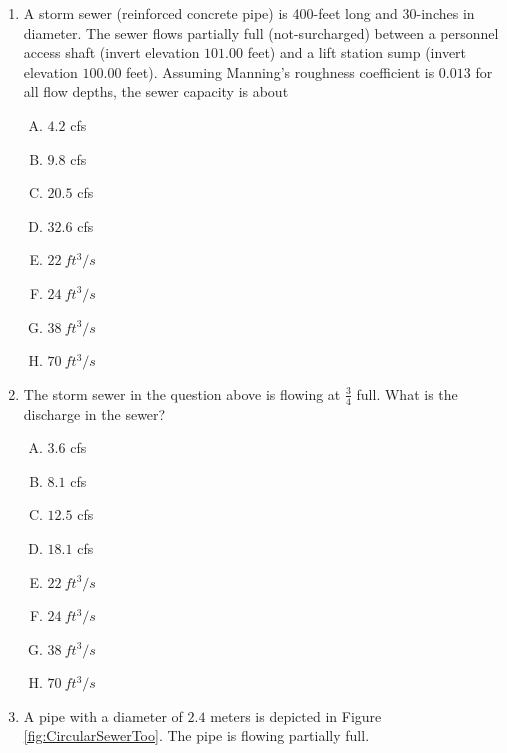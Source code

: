 \documentclass[11pt]{article}
\begin{document}
\begin{enumerate}
%
\item  A storm sewer (reinforced concrete pipe) is 400-feet long and 30-inches in diameter.  The sewer flows partially full (not-surcharged) between a personnel access shaft (invert elevation $101.00$ feet) and a lift station sump (invert elevation $100.00$ feet).  Assuming Manning's roughness coefficient is $0.013$ for all flow depths, the sewer capacity is about
\begin{enumerate} [(A)]
\item  $4.2$ cfs
\item  $9.8$ cfs
\item  $20.5$ cfs
\item  $32.6$ cfs
\item $22~ft^3/s$
\item $24~ft^3/s$
\item $38~ft^3/s$
\item $70~ft^3/s$
\end{enumerate}
\clearpage
\item The storm sewer in the question above is flowing at $\frac{3}{4}$ full.  What is the discharge in the sewer?
\begin{enumerate} [(A)]
\item  $3.6$ cfs
\item  $8.1$ cfs
\item  $12.5$ cfs
\item  $18.1$ cfs
\item $22~ft^3/s$
\item $24~ft^3/s$
\item $38~ft^3/s$
\item $70~ft^3/s$
\end{enumerate}
\item  A pipe with a diameter of $2.4$ meters is depicted in Figure \ref{fig:CircularSewerToo}.   The pipe is flowing partially full.


\end{enumerate}
\end{document}
